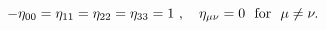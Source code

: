 \begin{equation}
-\eta_{00} = \eta_{11} = \eta_{22} = \eta_{33} = 1~,~~~ \eta_{\mu
\nu} = 0 ~~{\rm for}~~ \mu \neq \nu.             
\end{equation}

